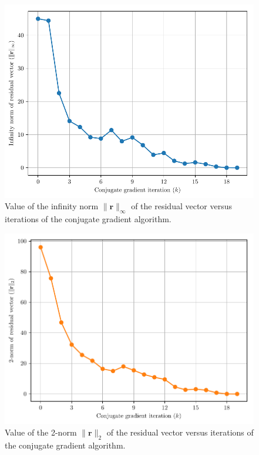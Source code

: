 \documentclass[a4paper,titlepage]{article}
\begin{document}
	\begin{figure}[!htb]
		\centering
		\includegraphics[width=\columnwidth]{plots/q3c_infinity.pdf}
		\caption
		{Value of the infinity norm $\|\textbf{r}\|_\infty$ of the residual vector versus iterations of the conjugate gradient algorithm.}
		\label{fig:q3c_infinity}
	\end{figure}
	
	\begin{figure}[!htb]
		\centering
		\includegraphics[width=\columnwidth]{plots/q3c_2.pdf}
		\caption
		{Value of the 2-norm $\|\textbf{r}\|_2$ of the residual vector versus iterations of the conjugate gradient algorithm.}
		\label{fig:q3c_2}
	\end{figure}
\end{document}
